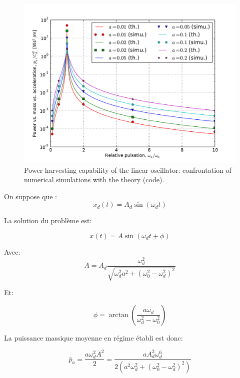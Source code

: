 \documentclass[a4paper,11pt,twoside]{article}
\begin{document}
\begin{figure}
\begin{center}
\includegraphics[width = 1.\textwidth]{../oscillators/example_code/linear_oscillator_power.pdf}
\end{center}
\caption{Power harvesting capability of the linear oscillator: confrontation of numerical simulations with the theory (\href{https://github.com/lcharleux/oscillators/blob/master/oscillators/example_code/linear_oscillator_power.py}{code}).}
\label{fig:linear_oscillator_power}
\end{figure}

On suppose que :
$$
x_d(t) = A_d \sin(\omega_d t)
$$

La solution du problème est:

\begin{equation}
x(t) = A \sin(\omega_d t + \phi) 
\end{equation}

Avec:
\begin{equation}
A = A_d\dfrac{\omega_d^2 }{\sqrt{\omega_d^2 a^2 + \left( \omega_0^2 - \omega_d^2\right)^2 } } 
\end{equation}

Et:

\begin{equation}
\phi = \arctan \left(\dfrac{a\omega_d}{\omega_d^2 - \omega_0^2} \right )
\end{equation}

La puissance massique moyenne en régime établi est donc:

\begin{equation}
\bar p_a = \frac{a\omega_d^2 A^2}{2} =   \dfrac{ a A_d^2 \omega_d^6}{2\left(a^2\omega_d^2 + \left( \omega_0^2 - \omega_d^2\right)^2 \right) } 
\end{equation}
\end{document}
